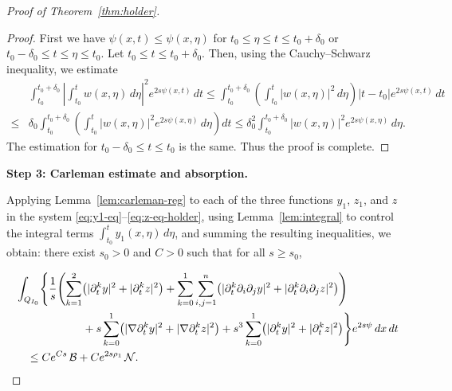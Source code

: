 \documentclass[12pt]{amsart}
\theoremstyle{plain}
\theoremstyle{definition}
\theoremstyle{remark}
\newcommand{\p}{\partial}
\begin{document}
\begin{proof}[Proof of Theorem~\ref{thm:holder}]
\begin{proof}
First we have $\psi(x, t) \leq \psi(x, \eta)$ for $t_0 \leq \eta \leq t \leq t_0+\delta_0$ or $t_0-\delta_0 \leq t \leq \eta \leq t_0$. Let $t_0 \leq t \leq t_0+\delta_0$. Then, using the Cauchy--Schwarz inequality, we estimate
$$
\begin{aligned}
& \int_{t_0}^{t_0+\delta_0}\left|\int_{t_0}^t w(x, \eta)\, d \eta\right|^2 e^{2 s \psi(x, t)}\, d t \leq \int_{t_0}^{t_0+\delta_0}\left(\int_{t_0}^t|w(x, \eta)|^2\, d \eta\right)\left|t-t_0\right| e^{2 s \psi(x, t)}\, d t \\
\leq{}& \delta_0 \int_{t_0}^{t_0+\delta_0}\left(\int_{t_0}^t|w(x, \eta)|^2 e^{2 s \psi(x, \eta)}\, d \eta\right) d t \leq \delta_0^2 \int_{t_0}^{t_0+\delta_0}|w(x, \eta)|^2 e^{2 s \psi(x, \eta)}\, d \eta.
\end{aligned}
$$
The estimation for $t_0-\delta_0 \leq t \leq t_0$ is the same. Thus the proof is complete.
\end{proof}


\medskip
\noindent\textbf{Step 3: Carleman estimate and absorption.}

Applying Lemma~\ref{lem:carleman-reg} to each of the three functions
$y_1$, $z_1$, and $z$ in the system
\eqref{eq:y1-eq}--\eqref{eq:z-eq-holder},
using Lemma~\ref{lem:integral} to control the integral terms
$\int_{t_0}^t y_1(x,\eta)\,d\eta$,
and summing the resulting inequalities, we obtain:
there exist $s_0>0$ and $C>0$ such that for all $s\ge s_0$,

\begin{align}
&\int_{Q_{I_0}}\Biggl\{\frac{1}{s}\Biggl(
\sum_{k=1}^2\bigl(|\p_t^k y|^2+|\p_t^k z|^2\bigr)
+\sum_{k=0}^1\sum_{i,j=1}^n
\bigl(|\p_t^k\p_i\p_j y|^2+|\p_t^k\p_i\p_j z|^2
\bigr)\Biggr)\notag\\
&\qquad\qquad\qquad
+s\sum_{k=0}^1\bigl(|\nabla\p_t^k y|^2+|\nabla\p_t^k z|^2\bigr)
+s^3\sum_{k=0}^1\bigl(|\p_t^k y|^2+|\p_t^k z|^2\bigr)
\Biggr\}e^{2s\psi}\,dx\,dt\notag\\
&\quad\le
Ce^{Cs}\,\mathcal{B}
+Ce^{2s\rho_1}\,\mathcal{N}.
\label{eq:holder-carleman-full}
\end{align}


\end{proof}
\end{document}
